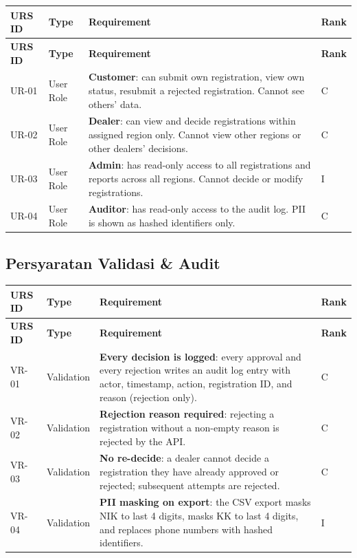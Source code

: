 \documentclass[12pt,a4paper]{article}
\begin{document}
\begin{longtable}{|p{2cm}|p{2.5cm}|p{8cm}|p{1cm}|}
\hline
\textbf{URS ID} & \textbf{Type} & \textbf{Requirement} & \textbf{Rank} \\
\hline
\endfirsthead
\hline
\textbf{URS ID} & \textbf{Type} & \textbf{Requirement} & \textbf{Rank} \\
\hline
\endhead
\hline
\endfoot

UR-01 & User Role & \textbf{Customer}: can submit own registration, view own status, resubmit a rejected registration. Cannot see others' data. & C \\
\hline

UR-02 & User Role & \textbf{Dealer}: can view and decide registrations within assigned region only. Cannot view other regions or other dealers' decisions. & C \\
\hline

UR-03 & User Role & \textbf{Admin}: has read-only access to all registrations and reports across all regions. Cannot decide or modify registrations. & I \\
\hline

UR-04 & User Role & \textbf{Auditor}: has read-only access to the audit log. PII is shown as hashed identifiers only. & C \\
\hline

\end{longtable}

\subsection{Persyaratan Validasi \& Audit}

\begin{longtable}{|p{2cm}|p{2.5cm}|p{8cm}|p{1cm}|}
\hline
\textbf{URS ID} & \textbf{Type} & \textbf{Requirement} & \textbf{Rank} \\
\hline
\endfirsthead
\hline
\textbf{URS ID} & \textbf{Type} & \textbf{Requirement} & \textbf{Rank} \\
\hline
\endhead
\hline
\endfoot

VR-01 & Validation & \textbf{Every decision is logged}: every approval and every rejection writes an audit log entry with actor, timestamp, action, registration ID, and reason (rejection only). & C \\
\hline

VR-02 & Validation & \textbf{Rejection reason required}: rejecting a registration without a non-empty reason is rejected by the API. & C \\
\hline

VR-03 & Validation & \textbf{No re-decide}: a dealer cannot decide a registration they have already approved or rejected; subsequent attempts are rejected. & C \\
\hline

VR-04 & Validation & \textbf{PII masking on export}: the CSV export masks NIK to last 4 digits, masks KK to last 4 digits, and replaces phone numbers with hashed identifiers. & I \\
\hline

\end{longtable}
\end{document}

